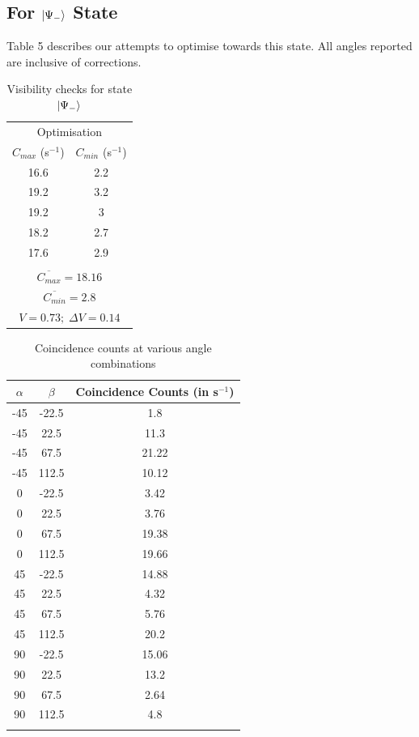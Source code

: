 \documentclass[10pt,a4paper]{article}
\begin{document}
\subsection*{For $\ket{\Psi_{-}}$ State}
Table 5 describes our attempts to optimise towards this state. All angles reported are inclusive of corrections.
\begin{table}[H]
\centering
\begin{tabular}{|c|c|}
\hline
\multicolumn{2}{|c|}{Optimisation}\\
$C_{max}$ (s$^{-1}$) & $C_{min}$ (s$^{-1}$)\\
\hline
16.6 & 2.2 \\
19.2 & 3.2 \\
19.2 & 3 \\
18.2 & 2.7 \\
17.6 & 2.9 \\
\hline
\multicolumn{2}{|c|}{}\\[-2mm]
\multicolumn{2}{|c|}{$\overline{C_{max}} = 18.16$}\\
\multicolumn{2}{|c|}{$\overline{C_{min}} = 2.8$}\\
\multicolumn{2}{|c|}{$V = 0.73;\; \Delta V = 0.14$}\\
\hline
\end{tabular}
\caption{Visibility checks for state $\ket{\Psi_{-}}$}
\end{table}
\begin{longtable}{|c|c|c|}
\hline
$\alpha$ & $\beta$ & Coincidence Counts (in s$^{-1}$)\\
\hline
-45 & -22.5 & 1.8\\
-45 & 22.5 & 11.3\\
-45 & 67.5 & 21.22\\
-45 & 112.5 & 10.12\\
\hline
0 & -22.5 & 3.42\\
0 & 22.5 & 3.76\\
0 & 67.5 & 19.38\\
0 & 112.5 & 19.66\\
\hline
45 & -22.5 & 14.88\\
45 & 22.5 & 4.32\\
45 & 67.5 & 5.76\\
45 & 112.5 & 20.2\\
\hline
90 & -22.5 & 15.06\\
90 & 22.5 & 13.2\\
90 & 67.5 & 2.64\\
90 & 112.5 & 4.8\\
\hline
\caption{Coincidence counts at various angle combinations}
\end{longtable}
\end{document}
